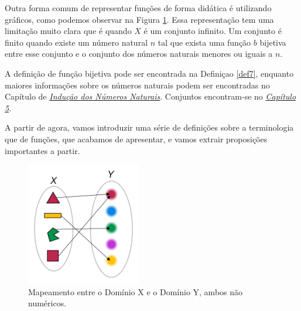 Outra forma comum de representar funções de forma didática é utilizando
gráficos, como podemos observar na Figura \ref{fig:functions-01-00}. Essa
representação tem uma limitação muito clara que é quando $X$ é um conjunto
infinito. Um conjunto é finito quando existe um número natural $n$ tal que
exista uma função $b$ bijetiva entre esse conjunto e o conjunto dos números
naturais menores ou iguais a $n$. 

A definição de função bijetiva pode ser encontrada na Definiçao \ref{def7},
enquanto maiores informações sobre os números naturais podem ser encontradas
no Capítulo de \textit{\hyperlink{chapter.8}{Indução dos Números Naturais}}.
Conjuntos encontram-se no \textit{\hyperlink{chapter.5}{Capítulo 5}}.

A partir de agora, vamos introduzir uma série de definições sobre a
terminologia que de funções, que acabamos de apresentar, e vamos extrair
proposições importantes a partir. 

\begin{figure}
    \centering      
    \includegraphics[width = 5cm]{figures/functions/fig-functions-01-00.png}
    \caption{Mapeamento entre o Domínio X e o Domínio Y, ambos não numéricos.}
    \label{fig:functions-01-00}
\end{figure}